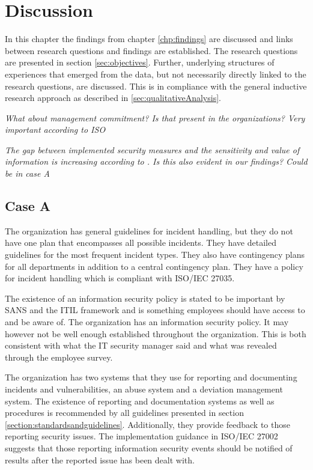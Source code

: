\chapter{Discussion}
\label{chp:discussion}
In this chapter the findings from chapter \ref{chp:findings} are discussed and links between research questions and findings are established. The research questions are presented in section \ref{sec:objectives}. Further, underlying structures of experiences that emerged from the data, but not necessarily directly linked to the research questions, are discussed. This is in compliance with the general inductive research approach as described in \ref{sec:qualitativeAnalysis}.  

\textit{What about management commitment? Is that present in the organizations? Very important according to ISO}

\textit{The gap between implemented security measures and the sensitivity and value of information is increasing according to \cite{Morketall2012}. Is this also evident in our findings? Could be in case A}

\section{Case A}
The organization has general guidelines for incident handling, but they do not have one plan that encompasses all possible incidents. They have detailed guidelines for the most frequent incident types. They also have contingency plans for all departments in addition to a central contingency plan. They have a policy for incident handling which is compliant with ISO/IEC 27035. 

The existence of an information security policy is stated to be important by SANS and the \acs{ITIL} framework and is something employees should have access to and be aware of. The organization has an information security policy. It may however not be well enough established throughout the organization. This is both consistent with what the IT security manager said and what was revealed through the employee survey.

The organization has two systems that they use for reporting and documenting incidents and vulnerabilities, an abuse system and a deviation management system. The existence of reporting and documentation systems as well as procedures is recommended by all guidelines presented in section \ref{section:standardsandguidelines}. Additionally, they provide feedback to those reporting security issues. The implementation guidance in ISO/IEC 27002 suggests that those reporting information security events should be notified of results after the reported issue has been dealt with. 

